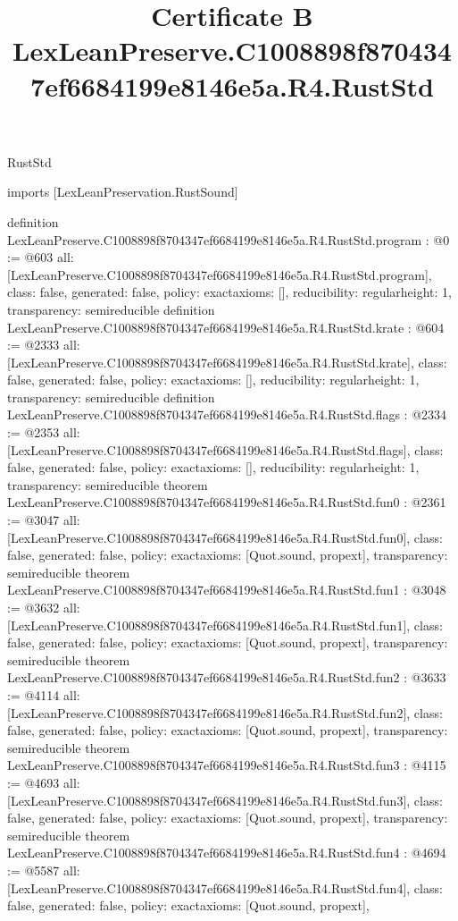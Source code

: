 \begin{lexlean}{RustStd}
\title{Certificate B LexLeanPreserve.C1008898f8704347ef6684199e8146e5a.R4.RustStd}
\begin{coremodule}
imports [LexLeanPreservation.RustSound]

definition LexLeanPreserve.C1008898f8704347ef6684199e8146e5a.R4.RustStd.program : @0 := @603 {
  all: [LexLeanPreserve.C1008898f8704347ef6684199e8146e5a.R4.RustStd.program],
  class: false,
  generated: false,
  policy: exact{axioms: []},
  reducibility: regular{height: 1},
  transparency: semireducible
}
definition LexLeanPreserve.C1008898f8704347ef6684199e8146e5a.R4.RustStd.krate : @604 := @2333 {
  all: [LexLeanPreserve.C1008898f8704347ef6684199e8146e5a.R4.RustStd.krate],
  class: false,
  generated: false,
  policy: exact{axioms: []},
  reducibility: regular{height: 1},
  transparency: semireducible
}
definition LexLeanPreserve.C1008898f8704347ef6684199e8146e5a.R4.RustStd.flags : @2334 := @2353 {
  all: [LexLeanPreserve.C1008898f8704347ef6684199e8146e5a.R4.RustStd.flags],
  class: false,
  generated: false,
  policy: exact{axioms: []},
  reducibility: regular{height: 1},
  transparency: semireducible
}
theorem LexLeanPreserve.C1008898f8704347ef6684199e8146e5a.R4.RustStd.fun0 : @2361 := @3047 {
  all: [LexLeanPreserve.C1008898f8704347ef6684199e8146e5a.R4.RustStd.fun0],
  class: false,
  generated: false,
  policy: exact{axioms: [Quot.sound, propext]},
  transparency: semireducible
}
theorem LexLeanPreserve.C1008898f8704347ef6684199e8146e5a.R4.RustStd.fun1 : @3048 := @3632 {
  all: [LexLeanPreserve.C1008898f8704347ef6684199e8146e5a.R4.RustStd.fun1],
  class: false,
  generated: false,
  policy: exact{axioms: [Quot.sound, propext]},
  transparency: semireducible
}
theorem LexLeanPreserve.C1008898f8704347ef6684199e8146e5a.R4.RustStd.fun2 : @3633 := @4114 {
  all: [LexLeanPreserve.C1008898f8704347ef6684199e8146e5a.R4.RustStd.fun2],
  class: false,
  generated: false,
  policy: exact{axioms: [Quot.sound, propext]},
  transparency: semireducible
}
theorem LexLeanPreserve.C1008898f8704347ef6684199e8146e5a.R4.RustStd.fun3 : @4115 := @4693 {
  all: [LexLeanPreserve.C1008898f8704347ef6684199e8146e5a.R4.RustStd.fun3],
  class: false,
  generated: false,
  policy: exact{axioms: [Quot.sound, propext]},
  transparency: semireducible
}
theorem LexLeanPreserve.C1008898f8704347ef6684199e8146e5a.R4.RustStd.fun4 : @4694 := @5587 {
  all: [LexLeanPreserve.C1008898f8704347ef6684199e8146e5a.R4.RustStd.fun4],
  class: false,
  generated: false,
  policy: exact{axioms: [Quot.sound, propext]},
}
\end{coremodule}
\end{lexlean}
